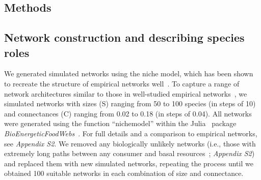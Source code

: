 \documentclass[12pt]{article}
\begin{document}
\begin{spacing}{2.0}

    



\section*{Methods}

    \subsection*{Network construction and describing species roles}

        We generated simulated networks using the niche model, which has been shown to recreate the structure of empirical networks well~\citep{Williams2000,Stouffer2007}.
        To capture a range of network architectures similar to those in well-studied empirical networks~\citep{Dunne2002,Dunne2002e}, we simulated networks with sizes (S) ranging from 50 to 100 species (in steps of 10) and connectances (C) ranging from 0.02 to 0.18 (in steps of 0.04). 
        All networks were generated using the function ``nichemodel'' within the Julia~\citep{Bezanson2017julia} package \emph{BioEnergeticFoodWebs}~\citep{bioenergfw,Delmas2017}.   
        For full details and a comparison to empirical networks, see \emph{Appendix S2}.
        We removed any biologically unlikely networks (i.e., those with extremely long paths between any consumer and basal resources~\citep{Borrelli2014}; \emph{Appendix S2}) and replaced them with new simulated networks, repeating the process until we obtained 100 suitable networks in each combination of size and connectance.


\end{spacing}
\end{document}
